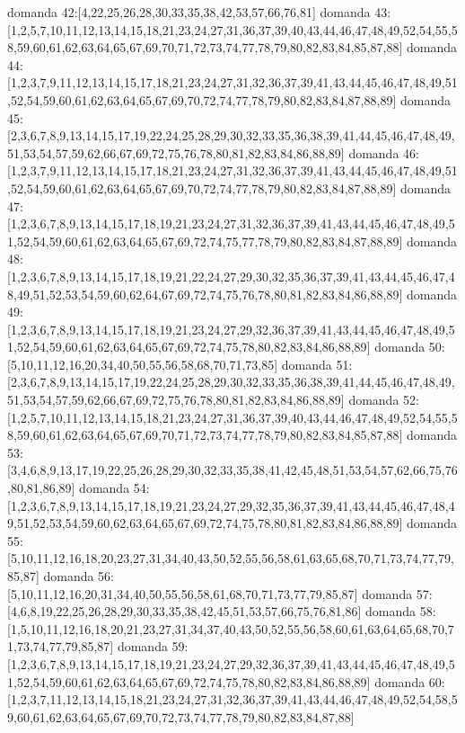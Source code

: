 domanda 42:[4,22,25,26,28,30,33,35,38,42,53,57,66,76,81]
domanda 43:[1,2,5,7,10,11,12,13,14,15,18,21,23,24,27,31,36,37,39,40,43,44,46,47,48,49,52,54,55,58,59,60,61,62,63,64,65,67,69,70,71,72,73,74,77,78,79,80,82,83,84,85,87,88]
domanda 44:[1,2,3,7,9,11,12,13,14,15,17,18,21,23,24,27,31,32,36,37,39,41,43,44,45,46,47,48,49,51,52,54,59,60,61,62,63,64,65,67,69,70,72,74,77,78,79,80,82,83,84,87,88,89]
domanda 45:[2,3,6,7,8,9,13,14,15,17,19,22,24,25,28,29,30,32,33,35,36,38,39,41,44,45,46,47,48,49,51,53,54,57,59,62,66,67,69,72,75,76,78,80,81,82,83,84,86,88,89]
domanda 46:[1,2,3,7,9,11,12,13,14,15,17,18,21,23,24,27,31,32,36,37,39,41,43,44,45,46,47,48,49,51,52,54,59,60,61,62,63,64,65,67,69,70,72,74,77,78,79,80,82,83,84,87,88,89]
domanda 47:[1,2,3,6,7,8,9,13,14,15,17,18,19,21,23,24,27,31,32,36,37,39,41,43,44,45,46,47,48,49,51,52,54,59,60,61,62,63,64,65,67,69,72,74,75,77,78,79,80,82,83,84,87,88,89]
domanda 48:[1,2,3,6,7,8,9,13,14,15,17,18,19,21,22,24,27,29,30,32,35,36,37,39,41,43,44,45,46,47,48,49,51,52,53,54,59,60,62,64,67,69,72,74,75,76,78,80,81,82,83,84,86,88,89]
domanda 49:[1,2,3,6,7,8,9,13,14,15,17,18,19,21,23,24,27,29,32,36,37,39,41,43,44,45,46,47,48,49,51,52,54,59,60,61,62,63,64,65,67,69,72,74,75,78,80,82,83,84,86,88,89]
domanda 50:[5,10,11,12,16,20,34,40,50,55,56,58,68,70,71,73,85]
domanda 51:[2,3,6,7,8,9,13,14,15,17,19,22,24,25,28,29,30,32,33,35,36,38,39,41,44,45,46,47,48,49,51,53,54,57,59,62,66,67,69,72,75,76,78,80,81,82,83,84,86,88,89]
domanda 52:[1,2,5,7,10,11,12,13,14,15,18,21,23,24,27,31,36,37,39,40,43,44,46,47,48,49,52,54,55,58,59,60,61,62,63,64,65,67,69,70,71,72,73,74,77,78,79,80,82,83,84,85,87,88]
domanda 53:[3,4,6,8,9,13,17,19,22,25,26,28,29,30,32,33,35,38,41,42,45,48,51,53,54,57,62,66,75,76,80,81,86,89]
domanda 54:[1,2,3,6,7,8,9,13,14,15,17,18,19,21,23,24,27,29,32,35,36,37,39,41,43,44,45,46,47,48,49,51,52,53,54,59,60,62,63,64,65,67,69,72,74,75,78,80,81,82,83,84,86,88,89]
domanda 55:[5,10,11,12,16,18,20,23,27,31,34,40,43,50,52,55,56,58,61,63,65,68,70,71,73,74,77,79,85,87]
domanda 56:[5,10,11,12,16,20,31,34,40,50,55,56,58,61,68,70,71,73,77,79,85,87]
domanda 57:[4,6,8,19,22,25,26,28,29,30,33,35,38,42,45,51,53,57,66,75,76,81,86]
domanda 58:[1,5,10,11,12,16,18,20,21,23,27,31,34,37,40,43,50,52,55,56,58,60,61,63,64,65,68,70,71,73,74,77,79,85,87]
domanda 59:[1,2,3,6,7,8,9,13,14,15,17,18,19,21,23,24,27,29,32,36,37,39,41,43,44,45,46,47,48,49,51,52,54,59,60,61,62,63,64,65,67,69,72,74,75,78,80,82,83,84,86,88,89]
domanda 60:[1,2,3,7,11,12,13,14,15,18,21,23,24,27,31,32,36,37,39,41,43,44,46,47,48,49,52,54,58,59,60,61,62,63,64,65,67,69,70,72,73,74,77,78,79,80,82,83,84,87,88]
